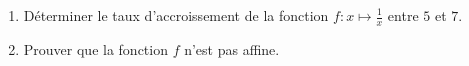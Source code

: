 %
%
%
\begin{exr}
  \begin{enumerate}
  \item Déterminer le taux d'accroissement de la fonction $f:x\mapsto \frac1x$ entre $5$ et $7$.
  \item Prouver que la fonction $f$ n'est pas affine.
  \end{enumerate}
\end{exr}